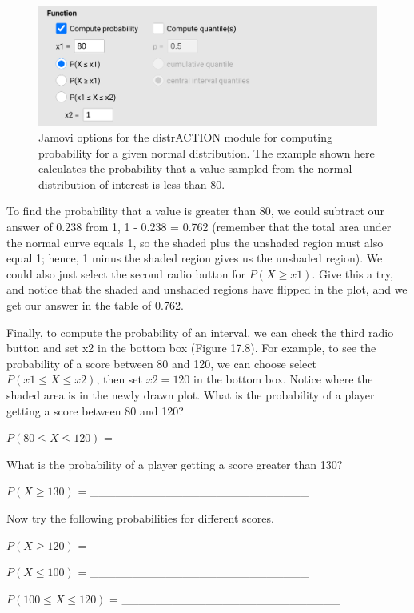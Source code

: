 \documentclass[
]{scrbook}
\begin{document}
\begin{figure}
\includegraphics[width=0.8\linewidth]{img/jamovi_normal_distribution} \caption{Jamovi options for the distrACTION module for computing probability for a given normal distribution. The example shown here calculates the probability that a value sampled from the normal distribution of interest is less than 80.}\label{fig:unnamed-chunk-78}
\end{figure}

To find the probability that a value is greater than 80, we could subtract our answer of 0.238 from 1, 1 - 0.238 = 0.762 (remember that the total area under the normal curve equals 1, so the shaded plus the unshaded region must also equal 1; hence, 1 minus the shaded region gives us the unshaded region).
We could also just select the second radio button for \(P(X \geq x1)\).
Give this a try, and notice that the shaded and unshaded regions have flipped in the plot, and we get our answer in the table of 0.762.

Finally, to compute the probability of an interval, we can check the third radio button and set x2 in the bottom box (Figure 17.8).
For example, to see the probability of a score between 80 and 120, we can choose select \(P(x1 \leq X \leq x2)\), then set \(x2 = 120\) in the bottom box.
Notice where the shaded area is in the newly drawn plot.
What is the probability of a player getting a score between 80 and 120?

\(P(80 \leq X \leq 120)\) = \_\_\_\_\_\_\_\_\_\_\_\_\_\_\_\_\_\_\_\_\_\_\_\_\_\_

What is the probability of a player getting a score greater than 130?

\(P(X \geq 130)\) = \_\_\_\_\_\_\_\_\_\_\_\_\_\_\_\_\_\_\_\_\_\_\_\_\_\_

Now try the following probabilities for different scores.

\(P(X \geq 120)\) = \_\_\_\_\_\_\_\_\_\_\_\_\_\_\_\_\_\_\_\_\_\_\_\_\_\_

\(P(X \leq 100)\) = \_\_\_\_\_\_\_\_\_\_\_\_\_\_\_\_\_\_\_\_\_\_\_\_\_\_

\(P(100 \leq X \leq 120)\) = \_\_\_\_\_\_\_\_\_\_\_\_\_\_\_\_\_\_\_\_\_\_\_\_\_\_
\end{document}
